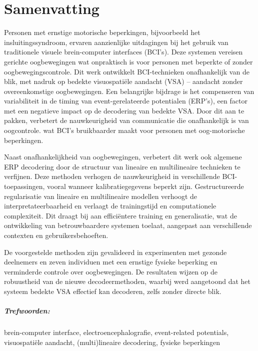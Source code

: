 \chapter*{Samenvatting}

Personen met ernstige motorische beperkingen, bijvoorbeeld het
insluitings\-syndroom, ervaren aanzienlijke uitdagingen bij het gebruik van
traditionele visuele brein-computer interfaces (BCI's).
Deze systemen vereisen gerichte oogbewegingen wat onpraktisch is voor personen
met beperkte of zonder oogbewegingscontrole.
Dit werk ontwikkelt BCI-technieken onafhankelijk van de blik, met nadruk
op bedekte visuospati\"ele aandacht (VSA) -- aandacht zonder overeenkomstige oogbewegingen.
Een belangrijke bijdrage is het compenseren van variabiliteit in de
timing van event-gerelateerde potentialen (ERP's), een factor met een negatieve
impact op de decodering van bedekte VSA.
Door dit aan te pakken, verbetert de nauwkeurigheid van communicatie die
onafhankelijk is van oogcontrole.
wat BCI's bruikbaarder maakt voor personen met oog-motorische beperkingen.

Naast onafhankelijkheid van oogbewegingen, verbetert dit werk ook algemene
ERP decodering door de structuur van lineaire en multilineaire technieken te verfijnen.
Deze methoden verhogen de nauwkeurigheid in verschillende BCI-toepassingen,
vooral wanneer kalibratiegegevens beperkt zijn.
Gestructureerde regularisatie van lineaire en
multilineaire modellen verhoogt de interpretateerbaarheid
en verlaagt de trainingstijd en computationele complexiteit.
Dit draagt bij aan efficiëntere training en generalisatie, wat
de ontwikkeling van betrouwbaardere systemen toelaat, aangepast aan
verschillende contexten en gebruikersbehoeften.

De voorgestelde methoden zijn gevalideerd in experimenten met gezonde
deelnemers en zeven individuen met een ernstige fysieke beperking en verminderde
controle over oogbewegingen.
De resultaten wijzen op de robuustheid van de nieuwe decodeermethoden,
waarbij werd aangetoond dat het systeem bedekte VSA effectief kan decoderen,
zelfs zonder directe blik.

\bigskip

\paragraph{Trefwoorden:}
brein-computer interface,
electroencephalografie,
event-related potentials,
visuospati\"ele aandacht,
(multi)lineaire decodering,
fysieke beperkingen
